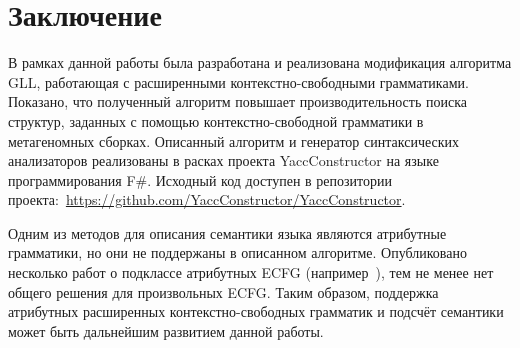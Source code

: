 \section*{Заключение}
В рамках данной работы была разработана и реализована модификация алгоритма GLL,
работающая с расширенными контекстно-свободными грамматиками. Показано, что полученный
алгоритм повышает производительность поиска структур, заданных с помощью контекстно-свободной
грамматики в метагеномных сборках. Описанный алгоритм и генератор синтаксических анализаторов реализованы
в расках проекта YaccConstructor на языке программирования F\#.
Исходный код доступен в репозитории проекта:~\url{https://github.com/YaccConstructor/YaccConstructor}.

         Одним из методов для описания семантики языка являются атрибутные грамматики, но они не поддержаны в описанном алгоритме.
Опубликовано несколько работ о подклассе атрибутных ECFG (например~\cite{AttributedELL}), тем не менее нет общего решения для произвольных ECFG.
Таким образом, поддержка атрибутных расширенных контекстно-свободных грамматик и подсчёт семантики может быть дальнейшим развитием данной работы.
%


